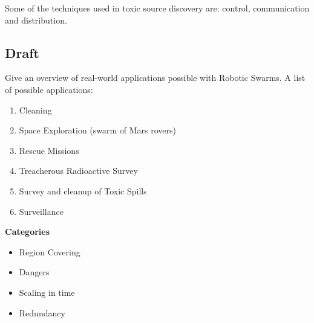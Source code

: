   Some of the techniques used in toxic source discovery are: control, communication and distribution.\cite{Li2012}
  
  \subsection{Draft}
  Give an overview of real-world applications possible with Robotic Swarms. A list of possible applications:
    \begin{enumerate}
      \item Cleaning
      \item Space Exploration (swarm of Mars rovers)
      \item Rescue Missions
      \item Treacherous Radioactive Survey
      \item Survey and cleanup of Toxic Spills
      \item Surveillance
    \end{enumerate}
  \textbf{Categories}
    \begin{itemize}
      \item Region Covering
      \item Dangers
      \item Scaling in time
      \item Redundancy
    \end{itemize}
  